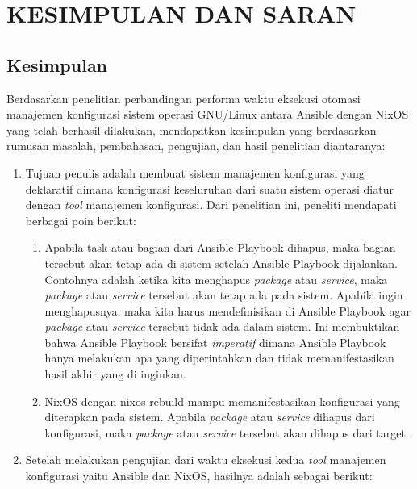 \documentclass[10pt,]{report}
\begin{document}
\chapter{KESIMPULAN DAN SARAN}
\section{Kesimpulan}
\begin{adjustwidth}{20pt}{}
  \hspace\parindent 
  Berdasarkan penelitian perbandingan performa waktu eksekusi otomasi manajemen 
  konfigurasi sistem operasi GNU/Linux antara Ansible dengan NixOS yang telah 
  berhasil dilakukan, mendapatkan kesimpulan yang berdasarkan rumusan masalah,
  pembahasan, pengujian, dan hasil penelitian diantaranya:
  \begin{enumerate}[label=\arabic*.]
    \item Tujuan penulis adalah membuat sistem manajemen konfigurasi yang 
      deklaratif dimana konfigurasi keseluruhan dari suatu sistem operasi diatur
      dengan \textit{tool} manajemen konfigurasi. Dari penelitian ini, peneliti
      mendapati berbagai poin berikut:
      \begin{enumerate}[label=\alph*.]
        \item Apabila task atau bagian dari Ansible Playbook dihapus, maka 
          bagian tersebut akan tetap ada di sistem setelah Ansible Playbook 
          dijalankan. Contohnya adalah ketika kita menghapus \textit{package}
          atau \textit{service}, maka \textit{package} atau \textit{service}
          tersebut akan tetap ada pada sistem. Apabila ingin menghapusnya, maka
          kita harus mendefinisikan di Ansible Playbook agar \textit{package} 
          atau \textit{service} tersebut tidak ada dalam sistem. Ini membuktikan
          bahwa Ansible Playbook bersifat \textit{imperatif} dimana Ansible 
          Playbook hanya melakukan apa yang diperintahkan dan tidak memanifestasikan
          hasil akhir yang di inginkan.
        \item NixOS dengan nixos-rebuild mampu memanifestasikan konfigurasi 
          yang diterapkan pada sistem. Apabila \textit{package} atau 
          \textit{service} dihapus dari konfigurasi, maka \textit{package}
          atau \textit{service} tersebut akan dihapus dari target.
    \end{enumerate}
  \item Setelah melakukan pengujian dari waktu eksekusi kedua \textit{tool} 
    manajemen konfigurasi yaitu Ansible dan NixOS, hasilnya adalah sebagai berikut:

\end{enumerate}
\end{adjustwidth}
\end{document}
